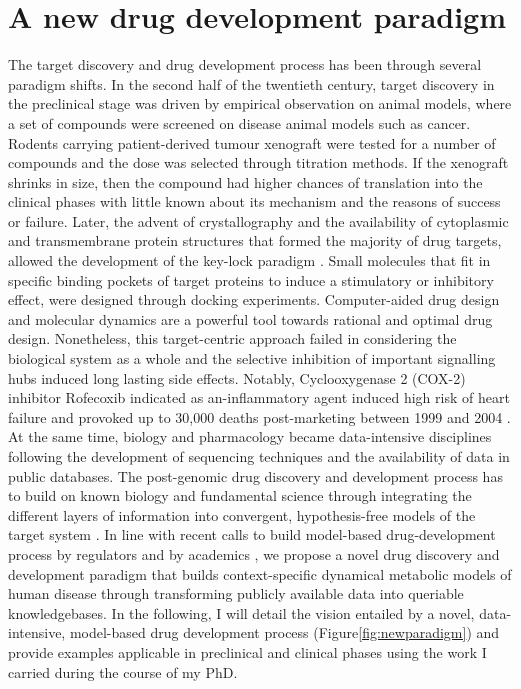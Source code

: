 \section{A new drug development paradigm}
The target discovery and drug development process has been through several paradigm shifts. In the second half of the twentieth century, target discovery in the preclinical stage was driven by empirical observation on animal models, where a set of compounds were screened on disease animal models such as cancer. Rodents carrying patient-derived tumour xenograft were tested for a number of compounds and the dose was selected through titration methods. If the xenograft shrinks in size, then the compound had higher chances of translation into the clinical phases with little known about its mechanism and the reasons of success or failure. Later, the advent of crystallography and the availability of cytoplasmic and transmembrane protein structures that formed the majority of drug targets, allowed the development of the key-lock paradigm \cite{medina2013shifting}. Small molecules that fit in specific binding pockets of target proteins to induce a stimulatory or inhibitory effect, were designed through docking experiments. Computer-aided drug design and molecular dynamics are a powerful tool towards rational and optimal drug design. Nonetheless, this target-centric approach failed in considering the biological system as a whole and the selective inhibition of important signalling hubs induced long lasting side effects. Notably, Cyclooxygenase 2 (COX-2) inhibitor Rofecoxib indicated as an-inflammatory agent induced high risk of heart failure and provoked up to 30,000 deaths post-marketing between 1999 and 2004 \cite{juni2004risk}. At the same time, biology and pharmacology became data-intensive disciplines following the development of sequencing techniques \cite{lander2001initial} and the availability of data in public databases. The post-genomic drug discovery and development process has to build on known biology and fundamental science through integrating the different layers of information into convergent, hypothesis-free models of the target system \cite{van2016taking}. In line with recent calls to build model-based drug-development process by regulators \cite{us2004innovation} and by academics \cite{oberhardt2013metabolically,van2011systems}, we propose a novel drug discovery and development paradigm that builds context-specific dynamical metabolic models of human disease through transforming publicly available data into queriable knowledgebases. In the following, I will detail the vision entailed by a novel, data-intensive, model-based drug development process (Figure\ref{fig:newparadigm}) and provide examples applicable in preclinical and clinical phases using the work I carried during the course of my PhD.

